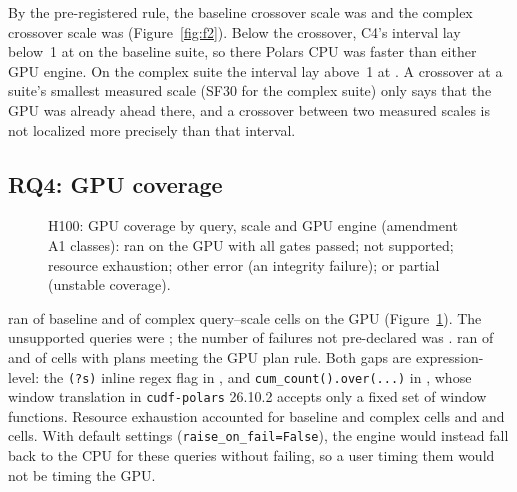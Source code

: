 \documentclass[sigconf, nonacm]{acmart}
\begin{document}
By the pre-registered rule, the baseline crossover scale was
 and the complex crossover scale was
 (Figure~\ref{fig:f2}). Below the crossover,
C4's interval lay below~1 at  on the baseline
suite, so there Polars CPU was faster than either GPU engine. On the complex
suite the interval lay above~1 at . A crossover
at a suite's smallest measured scale (SF30 for the complex suite) only says
that the GPU was already ahead there, and a crossover between two measured
scales is not localized more precisely than that interval.

\subsection{RQ4: GPU coverage}
\label{sec:rq4}

\begin{figure}[t]
\centering
{}
\caption{H100: GPU coverage by query, scale and GPU engine (amendment A1
classes): ran on the GPU with all gates passed; not supported; resource
exhaustion; other error (an integrity failure); or partial (unstable coverage).}
\label{fig:f4}
\end{figure}

\polarsgpu{} ran  of
 baseline and
 of
 complex query--scale cells on the GPU
(Figure~\ref{fig:f4}). The unsupported queries were
; the number of failures not
pre-declared was . \sparkgpu{} ran
 of
 and
 of
 cells with plans meeting the GPU plan
rule. Both \polarsgpu{} gaps are expression-level: the \texttt{(?s)} inline
regex flag in , and \texttt{cum\_count().over(...)} in
, whose window translation in \texttt{cudf-polars} 26.10.2
accepts only a fixed set of window functions. Resource exhaustion accounted for
 baseline and
 complex \polarsgpu{}
cells and  and
 \sparkgpu{} cells.
With default settings (\texttt{raise\_on\_fail=False}), the engine would
instead fall back to the CPU for these queries without failing, so a user
timing them would not be timing the GPU.
\end{document}
